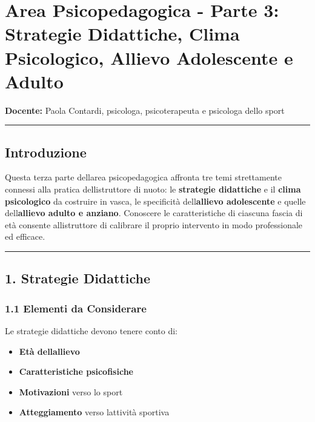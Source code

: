 \documentclass[a4paper,11pt]{article}
\providecommand{\tightlist}{%
  \setlength{\itemsep}{0pt}\setlength{\parskip}{0pt}}
\begin{document}
\section{Area Psicopedagogica - Parte 3: Strategie Didattiche, Clima
  Psicologico, Allievo Adolescente e
  Adulto}\label{area-psicopedagogica---parte-3-strategie-didattiche-clima-psicologico-allievo-adolescente-e-adulto}

\textbf{Docente:} Paola Contardi, psicologa, psicoterapeuta e psicologa
dello sport

\begin{center}\rule{0.5\linewidth}{0.5pt}\end{center}

\subsection{Introduzione}\label{introduzione-6}

Questa terza parte dell\textquotesingle area psicopedagogica affronta
tre temi strettamente connessi alla pratica
dell\textquotesingle istruttore di nuoto: le \textbf{strategie
      didattiche} e il \textbf{clima psicologico} da costruire in vasca, le
specificità dell\textquotesingle{}\textbf{allievo adolescente} e quelle
dell\textquotesingle{}\textbf{allievo adulto e anziano}. Conoscere le
caratteristiche di ciascuna fascia di età consente
all\textquotesingle istruttore di calibrare il proprio intervento in
modo professionale ed efficace.

\begin{center}\rule{0.5\linewidth}{0.5pt}\end{center}

\subsection{1. Strategie Didattiche}\label{strategie-didattiche}

\subsubsection{1.1 Elementi da
      Considerare}\label{elementi-da-considerare}

Le strategie didattiche devono tenere conto di:

\begin{itemize}
      \tightlist
      \item
            \textbf{Età dell\textquotesingle allievo}
      \item
            \textbf{Caratteristiche psicofisiche}
      \item
            \textbf{Motivazioni} verso lo sport
      \item
            \textbf{Atteggiamento} verso l\textquotesingle attività sportiva
\end{itemize}
\end{document}
